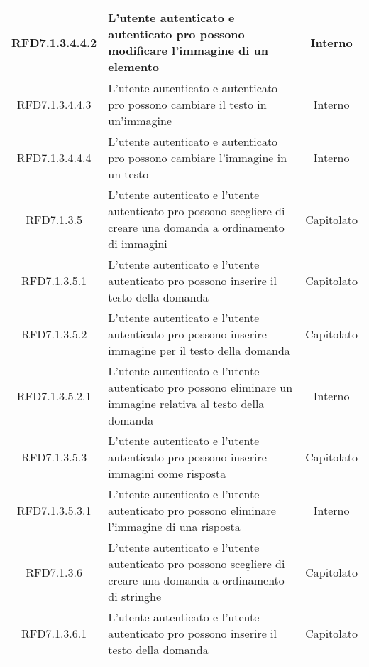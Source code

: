 \begin{longtable}{|c|>{\centering}m{7cm}|c|}
\hypertarget{RFD7.1.3.4.4.2}{RFD7.1.3.4.4.2} & L’utente autenticato e autenticato pro possono modificare l’immagine di un elemento & Interno
\\ \hline

\hypertarget{RFD7.1.3.4.4.3}{RFD7.1.3.4.4.3} & L’utente autenticato e autenticato pro possono cambiare il testo in un’immagine & Interno
\\ \hline

\hypertarget{RFD7.1.3.4.4.4}{RFD7.1.3.4.4.4} & L’utente autenticato e autenticato pro possono cambiare l’immagine in un testo & Interno
\\ \hline

\hypertarget{RFD7.1.3.5}{RFD7.1.3.5} & L’utente autenticato e l’utente autenticato pro possono scegliere di creare una domanda a ordinamento di immagini  & Capitolato
\\ \hline

\hypertarget{RFD7.1.3.5.1}{RFD7.1.3.5.1} & L’utente autenticato e l’utente autenticato pro possono inserire il testo della domanda & Capitolato
\\ \hline

\hypertarget{RFD7.1.3.5.2}{RFD7.1.3.5.2} & L’utente autenticato e l’utente autenticato pro possono inserire immagine per il testo della domanda & Capitolato
\\ \hline

\hypertarget{RFD7.1.3.5.2.1}{RFD7.1.3.5.2.1} & L’utente autenticato e l’utente autenticato pro possono eliminare un immagine relativa al testo della domanda  & Interno
\\ \hline

\hypertarget{RFD7.1.3.5.3}{RFD7.1.3.5.3} & L’utente autenticato e l’utente autenticato pro possono inserire immagini come risposta & Capitolato
\\ \hline

\hypertarget{RFD7.1.3.5.3.1}{RFD7.1.3.5.3.1} & L’utente autenticato e l’utente autenticato pro possono eliminare l’immagine di una risposta & Interno
\\ \hline

\hypertarget{RFD7.1.3.6}{RFD7.1.3.6} & L’utente autenticato e l’utente autenticato pro possono scegliere di creare una domanda a ordinamento di stringhe & Capitolato
\\ \hline

\hypertarget{RFD7.1.3.6.1}{RFD7.1.3.6.1} & L’utente autenticato e l’utente autenticato pro possono inserire il testo della domanda  & Capitolato
\\ \hline


\end{longtable}
